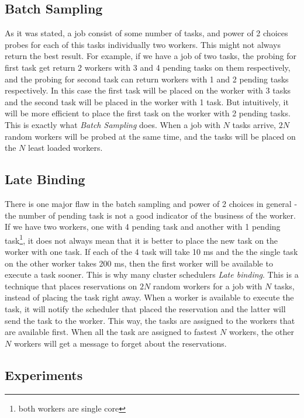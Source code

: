 \documentclass[11pt]{article}
\begin{document}
        
    \subsection{Batch Sampling}
    	\label{batchsampling}
    
    	As it was stated, a job consist of some number of tasks, and power of 2 choices probes for each of this tasks individually two workers. This might not always return the best result. For example, if we have a job of two tasks, the probing for first task get return 2 workers with 3 and 4 pending tasks on them respectively, and the probing for second task can return workers with 1 and 2 pending tasks respectively. In this case the first task will be placed on the worker with 3 tasks and the second task will be placed in the worker with 1 task. But intuitively, it will be more efficient to place the first task on the worker with 2 pending tasks. This is exactly what \textit{Batch Sampling} does. When a job with $N$ tasks arrive, $2N$ random workers will be probed at the same time, and the tasks will be placed on the $N$ least loaded workers.


    \subsection{Late Binding}
    
    	There is one major flaw in the batch sampling and power of 2 choices in general - the number of pending task is not a good indicator of the business of the worker. If we have two workers, one with 4 pending task and another with 1 pending task\footnote{both workers are single core}, it does not always mean that it is better to place the new task on the worker with one task. If each of the 4 task will take 10 ms and the the single task on the other worker takes 200 ms, then the first worker will be available to execute a task sooner. This is why many cluster schedulers \textit{Late binding}. This is a technique that places reservations on $2N$ random workers for a job with $N$ tasks, instead of placing the task right away. When a worker is available to execute the task, it will notify the scheduler that placed the reservation and the latter will send the task to the worker. This way, the tasks are assigned to the workers that are available first. When all the task are assigned to fastest $N$ workers, the other $N$ workers will get a message to forget about the reservations.


    \subsection{Experiments}
    
\end{document}

